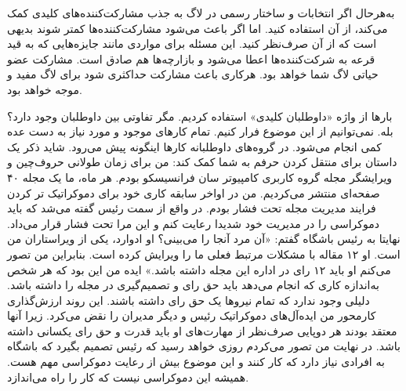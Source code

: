 به‌هرحال اگر انتخابات و ساختار رسمی در لاگ به جذب مشارکت‌کننده‌های کلیدی کمک می‌کند، از آن استفاده کنید.
اما اگر باعث می‌شود مشارکت‌کننده‌ها کمتر شوند بدیهی است  که از آن صرف‌نظر کنید. این مسئله برای مواردی
مانند جایزه‌هایی که به قید قرعه به شرکت‌کننده‌ها اعطا می‌شود
و بازارچه‌ها هم صادق است. مشارکت عضو حیاتی لاگ شما خواهد بود. هرکاری باعث مشارکت حداکثری شود
برای لاگ مفید و موجه خواهد بود.

بارها از واژه «داوطلبان کلیدی» استفاده کردیم. مگر تفاوتی بین داوطلبان وجود دارد؟ بله. نمی‌توانیم از این موضوع فرار
کنیم. تمام کارهای موجود و مورد نیاز به دست عده کمی انجام می‌شود. در گروه‌های داوطلبانه کارها اینگونه
پیش می‌رود. شاید ذکر یک داستان برای منتقل کردن حرفم به شما کمک کند:
من برای زمان طولانی حروف‌چین و ویرایشگر مجله گروه کاربری کامپیوتر سان فرانسیسکو بودم. هر ماه، ما یک مجله
۴۰ صفحه‌ای منتشر می‌کردیم. من در اواخر سابقه کاری خود برای دموکراتیک تر کردن فرایند مدیریت مجله تحت فشار بودم.
در واقع از سمت رئیس گفته می‌شد که باید دموکراسی را در مدیریت خود شدیدا رعایت کنم و این مرا تحت فشار قرار می‌داد.
نهایتا به رئیس باشگاه گفتم: «آن مرد آنجا را می‌بینی؟ او ادوارد، یکی از ویراستاران من است.
او ۱۲ مقاله با مشکلات مرتبط فعلی ما را ویرایش کرده است. بنابراین من تصور می‌کنم او باید ۱۲ رای در اداره این
مجله داشته باشد.» ایده من این بود که هر شخص به‌اندازه کاری که انجام می‌دهد باید حق رای و تصمیم‌گیری
در مجله را داشته باشد. دلیلی وجود ندارد که تمام نیروها یک حق رای داشته باشند.
این روند ارزش‌گذاری کارمحور من ایده‌آل‌های دموکراتیک رئیس و دیگر مدیران را نقض می‌کرد. زیرا آنها معتقد بودند
هر دوپایی صرف‌نظر از مهارت‌‌های او باید قدرت و حق رای یکسانی داشته باشد.
در نهایت من تصور می‌کردم روزی خواهد رسید که رئیس تصمیم بگیرد که باشگاه به افرادی نیاز دارد که کار کنند و
این موضوع بیش از رعایت دموکراسی مهم هست. همیشه این دموکراسی نیست که کار را راه می‌اندازد.

